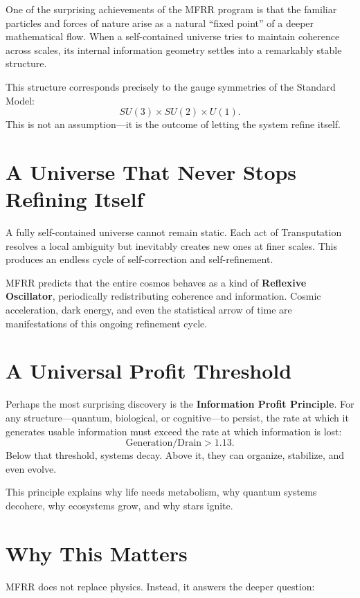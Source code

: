 \documentclass[11pt]{article}
\begin{document}
One of the surprising achievements of the MFRR program is that the familiar particles and
forces of nature arise as a natural ``fixed point'' of a deeper mathematical flow. When a
self-contained universe tries to maintain coherence across scales, its internal information
geometry settles into a remarkably stable structure.

This structure corresponds precisely to the gauge symmetries of the Standard Model:
\[
SU(3) \times SU(2) \times U(1).
\]
This is not an assumption—it is the outcome of letting the system refine itself.

\section*{A Universe That Never Stops Refining Itself}

A fully self-contained universe cannot remain static. Each act of Transputation resolves a
local ambiguity but inevitably creates new ones at finer scales. This produces an endless cycle
of self-correction and self-refinement.

MFRR predicts that the entire cosmos behaves as a kind of \textbf{Reflexive Oscillator},
periodically redistributing coherence and information. Cosmic acceleration, dark energy, and
even the statistical arrow of time are manifestations of this ongoing refinement cycle.

\section*{A Universal Profit Threshold}

Perhaps the most surprising discovery is the \textbf{Information Profit Principle}. For any
structure—quantum, biological, or cognitive—to persist, the rate at which it generates usable
information must exceed the rate at which information is lost:
\[
\text{Generation} / \text{Drain} > 1.13.
\]
Below that threshold, systems decay. Above it, they can organize, stabilize, and even evolve.

This principle explains why life needs metabolism, why quantum systems decohere, why
ecosystems grow, and why stars ignite.

\section*{Why This Matters}

MFRR does not replace physics. Instead, it answers the deeper question:
\end{document}
